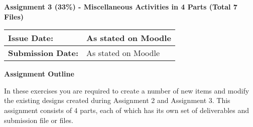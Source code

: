 
	
\begin{flushleft}
\Large\textbf{Assignment 3 (33\%) - Miscellaneous Activities in 4 Parts (Total 7 Files)}\\
\end{flushleft}


\begin{tabularx}{\textwidth}{ |X|X| }
	\hline
	\textbf{Issue Date:} & As stated on Moodle \\
	\hline 
	\textbf{Submission Date:}  & As stated on Moodle  \\
	\hline
\end{tabularx}


\begin{flushleft}
\large\textbf{Assignment Outline}\\
\end{flushleft}


In these exercises you are required to create a number of new items and modify the existing designs created during Assignment 2 and Assignment 3.  This assignment consists of 4 parts, each of which has its own set of deliverables and submission file or files.

